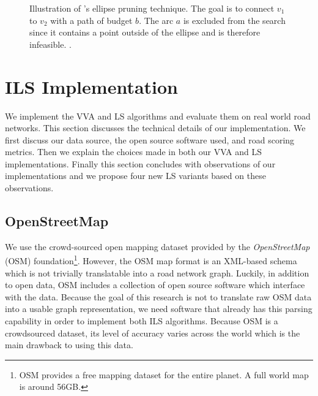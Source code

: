 \documentclass[honors]{union-cs-thesis}
\begin{document}
\begin{figure}
\begin{center}
\end{center}
\caption{Illustration of \citeauthor{lu2015arc}'s ellipse pruning technique. The goal is to connect $v_1$ to $v_2$ with a path of budget $b$. The arc $a$ is excluded from the search since it contains a point outside of the ellipse and is therefore infeasible. \cite{lu2015arc}.}
\label{fig:ellipse}
\end{figure}



\section{ILS Implementation}
\label{sec:ils-implementation}
We implement the VVA and LS algorithms and evaluate them on real world road networks. This section discusses the technical details of our implementation. We first discuss our data source, the open source software used, and road scoring metrics. Then we explain the choices made in both our VVA and LS implementations. Finally this section concludes with observations of our implementations and we propose four new LS variants based on these observations. 

\subsection{OpenStreetMap}
We use the crowd-sourced open mapping dataset provided by the \emph{OpenStreetMap} (OSM) foundation\footnote{OSM provides a free mapping dataset for the entire planet. A full world map is around 56GB.}\cite{osm}. However, the OSM map format is an XML-based schema which is not trivially translatable into a road network graph. Luckily, in addition to open data, OSM includes a collection of open source software which interface with the data. Because the goal of this research is not to translate raw OSM data into a usable graph representation, we need software that already has this parsing capability in order to implement both ILS algorithms. Because OSM is a crowdsourced dataset, its level of accuracy varies across the world which is the main drawback to using this data. 
\end{document}
